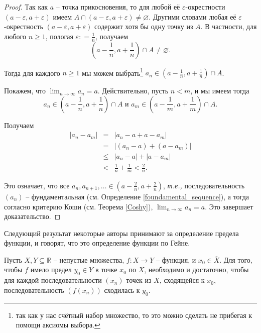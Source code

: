 \begin{proof}
 Так как $a$ -- точка прикосновения, то для любой её $\varepsilon$-окрестности $(a-\varepsilon, a+\varepsilon)$ имеем $A \cap (a-\varepsilon, a+\varepsilon) \ne \varnothing$. Другими словами любая её $\varepsilon$-окрестность $(a-\varepsilon, a+\varepsilon)$ содержит хотя бы одну точку из $A$. В частности,  для любого $n\ge 1$, пологая $\varepsilon: = \frac{1}{n}$, получаем 
 \[
  \left(a - \frac{1}{n}, a+ \frac{1}{n} \right) \cap A \ne \varnothing.
 \]

Тогда для каждого $n\ge 1$ мы можем выбрать\footnote{так как у нас счётный набор множество, то это можно сделать не прибегая к помощи аксиомы выбора.} $a_n \in   \left(a - \frac{1}{n}, a+ \frac{1}{n} \right) \cap A$.

Покажем, что $\lim_{n \to \infty} a_n = a$. Действительно, пусть $n<m$, и мы имеем тогда 
\[
 a_n \in   \left(a - \frac{1}{n}, a+ \frac{1}{n} \right) \cap A \mbox{ и } a_m \in   \left(a - \frac{1}{m}, a+ \frac{1}{m} \right) \cap A.
\]

Получаем
\begin{eqnarray*}
    |a_n -a_m| &=& |a_n - a + a - a_m| \\
    &=& |(a_n -a) + (a - a_m)| \\
    &\le & |a_n - a| + |a- a_m| \\
    &<& \frac{1}{n} + \frac{1}{m} < \frac{2}{n}.
\end{eqnarray*}

Это означает, что все $a_n, a_{n+1}, \ldots \in \left(a-\frac{2}{n}, a+ \frac{2}{n}\right)$, \textit{т.е.,} последовательность $(a_n)$ -- фундаментальная (см. Определение \ref{foundamental_sequence}), а тогда согласно критерию Коши (см. Теорема \ref{Coshy}), $\lim_{n \to \infty} a_n = a.$ Это завершает доказательство.
\end{proof}

Следующий результат некоторые авторы принимают за определение предела функции, и говорят, что это определение функции по Гейне.

\begin{theorem}\label{lim=>for_any_sequence}
 Пусть $X,Y \subseteq \mathbb{R}$ -- непустые множества, $f: X \to Y$ -- функция, и $x_0 \in \overline{X}.$ Для того, чтобы $f$ имело предел $y_0 \in Y$ в точке $x_0$ по $X$, необходимо и достаточно, чтобы для каждой последовательности $(x_n)$ точек из $X$, сходящейся к $x_0$, последовательность $(f(x_n))$ сходилась к $y_0.$
\end{theorem}

